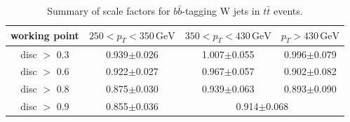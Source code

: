 \begin{table}[hbp!]
\centering
\caption{Summary of scale factors for $b\bar{b}$-tagging W jets in $t\bar{t}$ events.}
\label{tab:sf}
\begin{tabular}{c|ccc}
\hline\hline
working point & $250 < p_{T} < 350\,\textrm{GeV}$ & $350 < p_{T} < 430\,\textrm{GeV}$ & $p_{T}>430\,\textrm{GeV}$\\
\hline
disc $>$ 0.3 & 0.939$\pm$0.026 & 1.007$\pm$0.055 & 0.996$\pm$0.079 \\
disc $>$ 0.6 & 0.922$\pm$0.027 & 0.967$\pm$0.057 & 0.902$\pm$0.082  \\
disc $>$ 0.8 & 0.875$\pm$0.030 & 0.939$\pm$0.063 & 0.893$\pm$0.090  \\
disc $>$ 0.9 & 0.855$\pm$0.036 & \multicolumn{2}{c}{0.914$\pm$0.068} \\
\hline\hline
\end{tabular}
\end{table}
